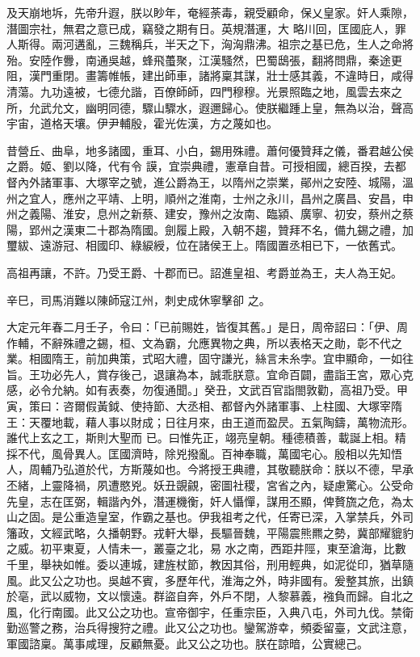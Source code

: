 \begin{pinyinscope}
 及天崩地坼，先帝升遐，朕以眇年，奄經荼毒，親受顧命，保乂皇家。奸人乘隙，潛圖宗社，無君之意已成，竊發之期有日。英規潛運，大
 略川回，匡國庇人，罪人斯得。兩河遘亂，三魏稱兵，半天之下，洶洶鼎沸。祖宗之基已危，生人之命將殆。安陸作釁，南通吳越，蜂飛蠆聚，江漢騷然，巴蜀鴟張，翻將問鼎，秦途更阻，漢門重閉。畫籌帷帳，建出師車，諸將稟其謀，壯士感其義，不違時日，咸得清蕩。九功遠被，七德允諧，百僚師師，四門穆穆。光景照臨之地，風雲去來之所，允武允文，幽明同德，驟山驟水，遐邇歸心。使朕繼踵上皇，無為以治，聲高宇宙，道格天壤。伊尹輔殷，霍光佐漢，方之蔑如也。



 昔營丘、曲阜，地多諸國，重耳、小白，錫用殊禮。蕭何優贊拜之儀，番君越公侯之爵。姬、劉以降，代有令
 謨，宜崇典禮，憲章自昔。可授相國，總百揆，去都督內外諸軍事、大塚宰之號，進公爵為王，以隋州之崇業，鄖州之安陸、城陽，溫州之宜人，應州之平靖、上明，順州之淮南，士州之永川，昌州之廣昌、安昌，申州之義陽、淮安，息州之新蔡、建安，豫州之汝南、臨潁、廣寧、初安，蔡州之蔡陽，郢州之漢東二十郡為隋國。劍履上殿，入朝不趨，贊拜不名，備九錫之禮，加璽紱、遠游冠、相國印、綠綟綬，位在諸侯王上。隋國置丞相已下，一依舊式。



 高祖再讓，不許。乃受王爵、十郡而已。詔進皇祖、考爵並為王，夫人為王妃。



 辛巳，司馬消難以陳師寇江州，刺史成休寧擊卻
 之。



 大定元年春二月壬子，令曰：「已前賜姓，皆復其舊。」是日，周帝詔曰：「伊、周作輔，不辭殊禮之錫，桓、文為霸，允應異物之典，所以表格天之勛，彰不代之業。相國隋王，前加典策，式昭大禮，固守謙光，絲言未糸孛。宜申顯命，一如往旨。王功必先人，賞存後己，退讓為本，誠乖朕意。宜命百闢，盡詣王宮，眾心克感，必令允納。如有表奏，勿復通聞。」癸丑，文武百官詣閤敦勸，高祖乃受。甲寅，策曰：咨爾假黃鉞、使持節、大丞相、都督內外諸軍事、上柱國、大塚宰隋王：天覆地載，藉人事以財成；日往月來，由王道而盈昃。五氣陶鑄，萬物流形。誰代上玄之工，斯則大聖而
 已。曰惟先正，翊亮皇朝。種德積善，載誕上相。精採不代，風骨異人。匡國濟時，除兇撥亂。百神奉職，萬國宅心。殷相以先知悟人，周輔乃弘道於代，方斯蔑如也。今將授王典禮，其敬聽朕命：朕以不德，早承丕緒，上靈降禍，夙遭愍兇。妖丑覬覦，密圖社稷，宮省之內，疑慮驚心。公受命先皇，志在匡弼，輯諧內外，潛運機衡，奸人懾憚，謀用丕顯，俾贅旒之危，為太山之固。是公重造皇室，作霸之基也。伊我祖考之代，任寄已深，入掌禁兵，外司籓政，文經武略，久播朝野。戎軒大舉，長驅晉魏，平陽震熊羆之勢，冀部耀貔豹之威。初平東夏，人情未一，叢臺之北，易
 水之南，西距井陘，東至滄海，比數千里，舉袂如帷。委以連城，建旌杖節，教因其俗，刑用輕典，如泥從印，猶草隨風。此又公之功也。吳越不賓，多歷年代，淮海之外，時非國有。爰整其旅，出鎮於亳，武以威物，文以懷遠。群盜自奔，外戶不閉，人黎慕義，襁負而歸。自北之風，化行南國。此又公之功也。宣帝御宇，任重宗臣，入典八屯，外司九伐。禁衛勤巡警之務，治兵得搜狩之禮。此又公之功也。鑾駕游幸，頻委留臺，文武注意，軍國諮稟。萬事咸理，反顧無憂。此又公之功也。朕在諒暗，公實總己。




\end{pinyinscope}
